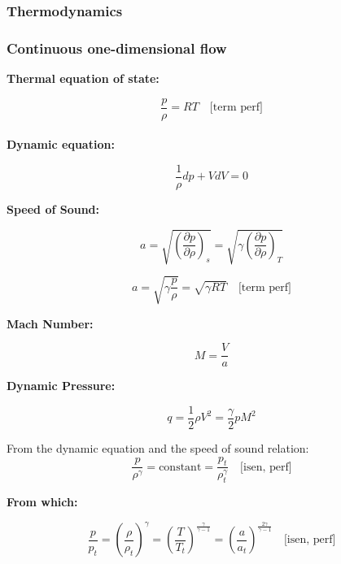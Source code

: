 \subsubsection{Thermodynamics}


\subsubsection{Continuous one-dimensional flow}

\textbf{Thermal equation of state:}

\begin{equation}
	\frac{p}{\rho} = RT \quad \text{[term perf]}
\end{equation}\\

\textbf{Dynamic equation:}

\begin{equation}
	\frac{1}{\rho} dp + V dV = 0
\end{equation}

\textbf{Speed of Sound:}

\begin{equation}
	a = \sqrt{\left(\frac{\partial p}{\partial \rho}\right)_s} = \sqrt{\gamma \left(\frac{\partial p}{\partial \rho}\right)_T}
\end{equation}

\begin{equation}
	a = \sqrt{\gamma \frac{p}{\rho}} = \sqrt{\gamma RT} \quad \text{[term perf]} \tag{36}
\end{equation}

\textbf{Mach Number:}

\begin{equation}
	M = \frac{V}{a}
\end{equation}

\textbf{Dynamic Pressure:}

\begin{equation}
	q = \frac{1}{2} \rho V^2=\frac{\gamma}{2} p M^2
\end{equation}

From the dynamic equation and the speed of sound relation:
\begin{equation}
	\frac{p}{\rho^\gamma} = \text{constant} = \frac{p_t}{\rho_t^\gamma}\quad \text{[isen, perf]} \tag{34}
\end{equation}

\textbf{From which:}

\begin{equation}
	\frac{p}{p_t} = \left(\frac{\rho}{\rho_t}\right)^\gamma = \left(\frac{T}{T_t}\right)^{\frac{\gamma}{\gamma - 1}} = \left(\frac{a}{a_t}\right)^{\frac{2\gamma}{\gamma - 1}}\quad \text{[isen, perf]} \tag{35}
\end{equation}


